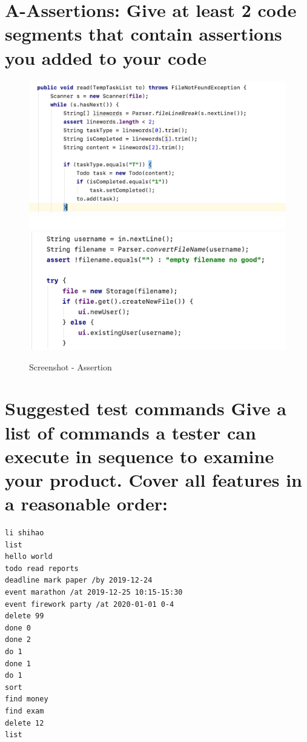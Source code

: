 \documentclass[a4paper,11pt, twoside]{article}
\begin{document}
\begin{table} [htbp]
\section* {A-Assertions: Give at least 2 code segments that contain assertions you added to your code} 
\begin{figure}[H]
\centering
\includegraphics[width = 15.4cm]{assert1.png} 
\includegraphics[height = 0.5 cm]{liner.png} 
\includegraphics[width = 12.6cm]{assert2.png}
\caption{Screenshot - Assertion} 
\end{figure} 

\section* {Suggested test commands Give a list of commands a tester can execute in sequence to examine your product. Cover all features in a reasonable order: } 
\begin{multicols}{2}
\begin{verbatim}
li shihao
list
hello world
todo read reports 
deadline mark paper /by 2019-12-24
event marathon /at 2019-12-25 10:15-15:30
event firework party /at 2020-01-01 0-4
delete 99
done 0
done 2
do 1
done 1
do 1
sort
find money
find exam
delete 12
list


\end{verbatim}
\end{multicols}
\end{table}
\end{document}
